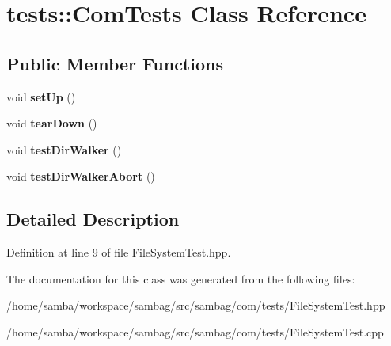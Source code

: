 \hypertarget{classtests_1_1_com_tests}{
\section{tests::ComTests Class Reference}
\label{classtests_1_1_com_tests}
}
\subsection*{Public Member Functions}
\begin{DoxyCompactItemize}
\item 
\hypertarget{classtests_1_1_com_tests_a076ae7be2c82946ea1f0893e8a4f7792}{
void {\bfseries setUp} ()}
\label{classtests_1_1_com_tests_a076ae7be2c82946ea1f0893e8a4f7792}

\item 
\hypertarget{classtests_1_1_com_tests_a4fa483294bab43ea2a457c7d3c46e5c3}{
void {\bfseries tearDown} ()}
\label{classtests_1_1_com_tests_a4fa483294bab43ea2a457c7d3c46e5c3}

\item 
\hypertarget{classtests_1_1_com_tests_a7d5d17aef7b91e37fcded9c5a67b9ae8}{
void {\bfseries testDirWalker} ()}
\label{classtests_1_1_com_tests_a7d5d17aef7b91e37fcded9c5a67b9ae8}

\item 
\hypertarget{classtests_1_1_com_tests_a1d2bd7ec84a408731569f2a5007a33fd}{
void {\bfseries testDirWalkerAbort} ()}
\label{classtests_1_1_com_tests_a1d2bd7ec84a408731569f2a5007a33fd}

\end{DoxyCompactItemize}


\subsection{Detailed Description}


Definition at line 9 of file FileSystemTest.hpp.



The documentation for this class was generated from the following files:\begin{DoxyCompactItemize}
\item 
/home/samba/workspace/sambag/src/sambag/com/tests/FileSystemTest.hpp\item 
/home/samba/workspace/sambag/src/sambag/com/tests/FileSystemTest.cpp\end{DoxyCompactItemize}
